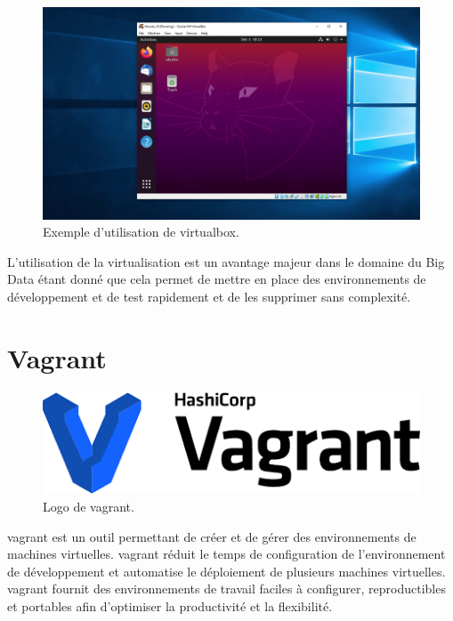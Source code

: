 \documentclass[12pt, french]{report}
\begin{document}
\begin{figure}[h]
\includegraphics[scale=0.2]{assets/img/example-vbox.png}
\centering
\caption{Exemple d'utilisation de \gls{virtualbox}.}
\label{fig:example-vbox}
\end{figure}

L'utilisation de la virtualisation est un avantage majeur dans le domaine du Big Data étant donné que cela permet de mettre en place des environnements de développement et de test rapidement et de les supprimer sans complexité.

\section{Vagrant}

\begin{figure}[H]
\includegraphics[scale=0.5]{assets/img/logo-vagrant.png}
\centering
\caption{Logo de \gls{vagrant}.}
\label{fig:logo-adaltas}
\end{figure}

\gls{vagrant} est un outil permettant de créer et de gérer des environnements de machines virtuelles. \gls{vagrant} réduit le temps de configuration de l'environnement de développement et automatise le déploiement de plusieurs machines virtuelles. \gls{vagrant} fournit des environnements de travail faciles à configurer, reproductibles et portables afin d'optimiser la productivité et la flexibilité.
\end{document}
